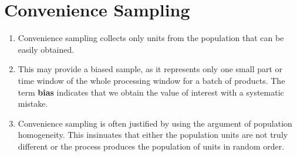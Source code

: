 \section{Convenience Sampling \cite{statistics/book/Statistics-for-Data-Scientists/Maurits-Kaptein}}\label{Sampling Plans/Non-representative Sampling/Convenience Sampling}

\begin{enumerate}
    \item Convenience sampling collects only units from the population that can be easily obtained.
    \hfill \cite{statistics/book/Statistics-for-Data-Scientists/Maurits-Kaptein}

    \item This may provide a biased sample, as it represents only one small part or time window of the whole processing window for a batch of products. The term \textbf{bias}\label{Sampling Plans/Non-representative Sampling/Convenience Sampling/bias} indicates that we obtain the value of interest with a systematic mistake.
    \hfill \cite{statistics/book/Statistics-for-Data-Scientists/Maurits-Kaptein}

    \item  Convenience sampling is often justified by using the argument of population homogeneity. This insinuates that either the population units are not truly different or the process produces the population of units in random order.
    \hfill \cite{statistics/book/Statistics-for-Data-Scientists/Maurits-Kaptein}
\end{enumerate}

